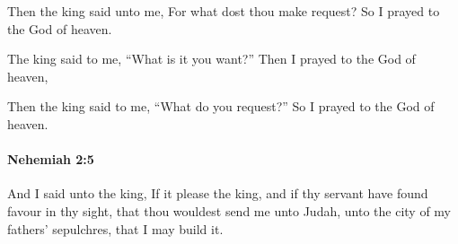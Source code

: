 			\begin{versebox}
					\item[BHS] 
					\item[LXX] 
					\item[ASV] Then the king said unto me, For what dost thou make request? So I prayed to the God of heaven.
					\item[NIV] The king said to me, “What is it you want?” Then I prayed to the God of heaven,
					\item[NRSV] Then the king said to me, “What do you request?” So I prayed to the God of heaven.
			\end{versebox}

		\paragraph{Nehemiah 2:5} %
			\label{NEHEMIAH-2-5}

			And I said unto the king, If it please the king, and if thy servant have found favour in thy sight, that thou wouldest send me unto Judah, unto the city of my fathers’ sepulchres, that I may build it.

